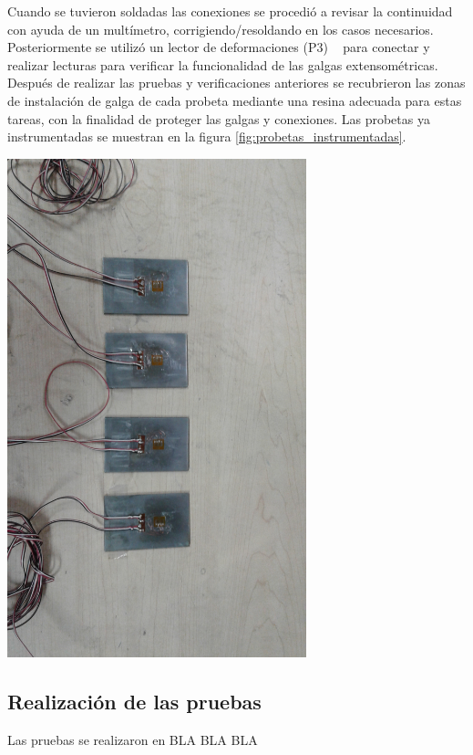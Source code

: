 Cuando se tuvieron soldadas las conexiones se procedió a revisar la continuidad con ayuda de un 
multímetro, corrigiendo/resoldando en los casos necesarios. Posteriormente se utilizó un lector 
de deformaciones (P3) ~\cite{p3indicator} para conectar y realizar lecturas para verificar la funcionalidad de las 
galgas extensométricas.\\

Después de realizar las pruebas y verificaciones anteriores se recubrieron las zonas de instalación 
de galga de cada probeta mediante una resina adecuada para estas tareas, con la finalidad de 
proteger las galgas y conexiones. Las probetas ya instrumentadas se muestran en la 
figura \ref{fig:probetas_instrumentadas}.

\begin{center}
\includegraphics[width=0.65\textwidth]{src/ch3/probetas_instrumentadas.jpg}
\label{fig:probetas_instrumentadas}
\end{center}


\subsection{Realización de las pruebas}

Las pruebas se realizaron en BLA BLA BLA 




